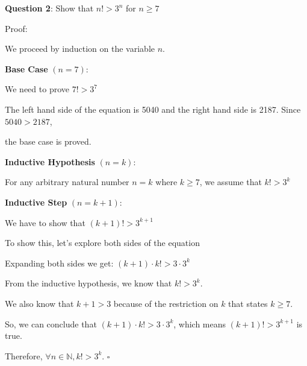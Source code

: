 \documentclass{article} %
\newcommand{\question}[2][]{\begin{flushleft}
        \textbf{Question #1}: #2

\end{flushleft}}
\begin{document}
                                                                   

    \question[2]{Show that $n! > 3^n$ for $n \geq 7$}

    Proof: 

    We proceed by induction on the variable $n$.

    \textbf{Base Case} $(n = 7)$:

    We need to prove $7! > 3^7$

    The left hand side of the equation is 5040 and the right hand side is 2187. Since $5040 > 2187$, 
    
    the base case is proved.

    \textbf{Inductive Hypothesis} $(n = k)$:

    For any arbitrary natural number $n = k$ where $k \geq 7$, we assume that $k! > 3^k$

    \textbf{Inductive Step} $(n = k + 1)$:

    We have to show that $(k + 1)! > 3^{k + 1}$

    To show this, let's explore both sides of the equation

    Expanding both sides we get: $(k + 1) \cdot k! > 3 \cdot 3^k$ 

    From the inductive hypothesis, we know that $k! > 3^k$.

    We also know that $k + 1 > 3$ because of the restriction on $k$ that states $k \geq 7$.

    So, we can conclude that $(k + 1) \cdot k! > 3 \cdot 3^k$, which means $(k + 1)! > 3^{k + 1}$ is true.

    Therefore, $\forall n \in \mathbb{N}, k! > 3^k$. $\square$


    \newpage


\end{document}
